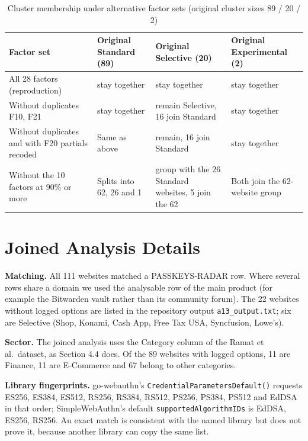 \documentclass[letterpaper,twocolumn,10pt]{article}
\begin{document}
\begin{table}[t]\centering\footnotesize\setlength{\tabcolsep}{3pt}\caption{Cluster membership under alternative factor sets (original cluster sizes 89 / 20 / 2)}\label{tab:13}
\begin{tabularx}{\textwidth}{>{\raggedright\arraybackslash}X>{\raggedright\arraybackslash}X>{\raggedright\arraybackslash}X>{\raggedright\arraybackslash}X}\toprule
\textbf{Factor set} & \textbf{Original Standard (89)} & \textbf{Original Selective (20)} & \textbf{Original Experimental (2)} \\ \midrule
All 28 factors (reproduction) & 89 stay together & 20 stay together & 2 stay together \\
Without duplicates F10, F21 & 89 stay together & 4 remain Selective, 16 join Standard & 2 stay together \\
Without duplicates and with F20 partials recoded & Same as above & 4 remain, 16 join Standard & 2 stay together \\
Without the 10 factors at 90\% or more & Splits into 62, 26 and 1 & 15 group with the 26 Standard websites, 5 join the 62 & Both join the 62-website group \\
\bottomrule\end{tabularx}\end{table}

\section{Joined Analysis Details}

\textbf{Matching.} All 111 websites matched a PASSKEYS-RADAR row. Where several rows share a domain we used the analysable row of the main product (for example the Bitwarden vault rather than its community forum). The 22 websites without logged options are listed in the repository output \texttt{a13\_output.txt}; six are Selective (Shop, Konami, Cash App, Free Tax USA, Syncfusion, Lowe's).

\textbf{Sector.} The joined analysis uses the Category column of the Ramat et al.~dataset, as Section 4.4 does. Of the 89 websites with logged options, 11 are Finance, 11 are E-Commerce and 67 belong to other categories.

\textbf{Library fingerprints.} go-webauthn's \texttt{CredentialParametersDefault()} requests ES256, ES384, ES512, RS256, RS384, RS512, PS256, PS384, PS512 and EdDSA in that order; SimpleWebAuthn's default \texttt{supportedAlgorithmIDs} is EdDSA, ES256, RS256. An exact match is consistent with the named library but does not prove it, because another library can copy the same list.
\end{document}
